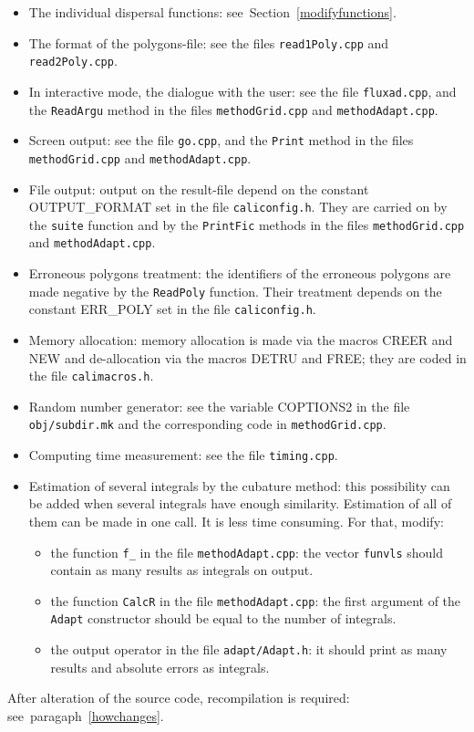 \begin{itemize}
\item
The individual dispersal functions:
see~Section~\ref{modifyfunctions}.
\item
The format of the polygons-file:
see the files \texttt{read1Poly.cpp}
and \texttt{read2Poly.cpp}.

\item
In interactive mode, the dialogue with the user:
see the file \texttt{fluxad.cpp},
and the \texttt{ReadArgu} method in the files
\texttt{methodGrid.cpp} and \texttt{methodAdapt.cpp}.


\item
Screen output:
see the file \texttt{go.cpp},
and the \texttt{Print} method in the files
\texttt{methodGrid.cpp} and \texttt{methodAdapt.cpp}.


\item
File output:
output on the result-file depend on the constant
OUTPUT\_FORMAT set in the file \texttt{caliconfig.h}.
They are carried on by
the \texttt{suite} function
and by the \texttt{PrintFic} methods in the files
\texttt{methodGrid.cpp} and \texttt{methodAdapt.cpp}.

\item
Erroneous polygons treatment:
the identifiers of the erroneous polygons
are made negative by the \texttt{ReadPoly}
function.
Their treatment depends on the constant
ERR\_POLY set in the file \texttt{caliconfig.h}.

\item
Memory allocation:
memory allocation is made via the macros CREER and NEW and
de-allocation  via the macros DETRU and FREE; they are coded in the
file
\texttt{calimacros.h}.

\item
Random number generator:
see the variable COPTIONS2 in the file \texttt{obj/subdir.mk}
and the corresponding code in \texttt{methodGrid.cpp}.

\item
Computing time measurement:
 see the file \texttt{timing.cpp}.
\item
Estimation of several integrals by the cubature method:
this possibility can be added
when  several integrals  have enough  similarity.
Estimation of all of them
can be made in one call. It is less time consuming.
For that, modify:
\begin{itemize}
\item
the function \texttt{f\_}  in the file \texttt{methodAdapt.cpp}:
the vector  \texttt{funvls}  should contain as many results
as integrals on output.
\item
the function \texttt{CalcR} in the file \texttt{methodAdapt.cpp}:
the first argument of the \texttt{Adapt} constructor should be
 equal to
the number of integrals. 
\item
the output operator in the file
\texttt{adapt/Adapt.h}:
it
should print as many results and absolute errors as integrals.
\end{itemize}
\end{itemize}

After alteration of the source code, recompilation is required:
see~paragaph~\ref{howchanges}.


